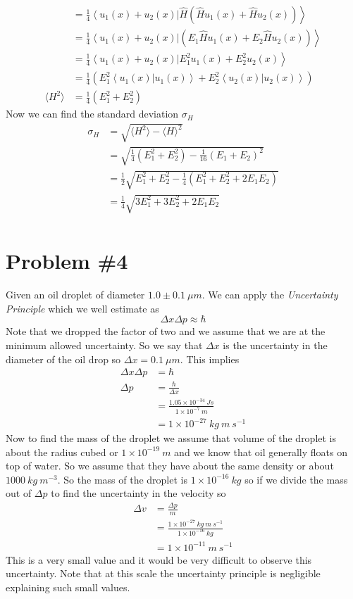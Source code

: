 \documentclass[11pt]{article}
\numberwithin{equation}{section}
\newcommand{\expt}[1]{\langle{#1}\rangle}
\newcommand{\norm}[2]{\left\langle{#1}\right|\left.{#2}\right\rangle}
\begin{document}
\begin{enumerate}[(a)]
\begin{align*}
&= \frac{1}{4}\norm{u_1(x)+u_2(x)}{\hat{H}\left(\hat{H}u_1(x)+\hat{H}u_2(x)\right)} \\
&= \frac{1}{4}\norm{u_1(x)+u_2(x)}{\left(E_1\hat{H}u_1(x)+E_2\hat{H}u_2(x)\right)} \\
&= \frac{1}{4}\norm{u_1(x)+u_2(x)}{E_1^2u_1(x)+E_2^2u_2(x)} \\
&= \frac{1}{4}\left(E_1^2\norm{u_1(x)}{u_1(x)}+E_2^2\norm{u_2(x)}{u_2(x)}\right) \\
\expt{H^2} &= \frac{1}{4}\left(E_1^2+E_2^2\right)
\end{align*}
Now we can find the standard deviation $\sigma_H$
\begin{align*}
\sigma_H &= \sqrt{\expt{H^2} - \expt{H}^2}\\
&= \sqrt{\frac{1}{4}\left(E_1^2+E_2^2\right) - \frac{1}{16}\left(E_1+E_2\right)^2}\\
&= \frac{1}{2}\sqrt{E_1^2+E_2^2 - \frac{1}{4}\left(E_1^2+E_2^2+2E_1E_2\right)}\\
&= \frac{1}{4}\sqrt{3E_1^2+3E_2^2 + 2E_1E_2}\\
\end{align*}
\end{enumerate}

\section{Problem \#4}
Given an oil droplet of diameter $1.0\pm0.1\ \mu m$. We can apply the \emph{Uncertainty Principle} which we well estimate as
$$\Delta x\Delta p\approx\hbar$$
Note that we dropped the factor of two and we assume that we are at the minimum allowed uncertainty. So we say that $\Delta x$ is the uncertainty in the diameter of the oil drop so $\Delta x=0.1\ \mu m$. This implies
\begin{align*}
\Delta x\Delta p &= \hbar\\
\Delta p &= \frac{\hbar}{\Delta x}\\
&= \frac{1.05\times10^{-34}\ Js}{1\times10^{-7}\ m}\\
&= 1\times10^{-27}\ kg\ m\ s^{-1}
\end{align*}
Now to find the mass of the droplet we assume that volume of the droplet is about the radius cubed or $1\times10^{-19}\ m$ and we know that oil generally floats on top of water. So we assume that they have about the same density or about $1000\ kg\ m^{-3}$. So the mass of the droplet is $1\times10^{-16}\ kg$ so if we divide the mass out of $\Delta p$ to find the uncertainty in the velocity so
\begin{align*}
\Delta v &= \frac{\Delta p}{m}\\
&= \frac{1\times10^{-27}\ kg\ m\ s^{-1}}{1\times10^{-16}\ kg}\\
&= 1\times10^{-11}\ m\ s^{-1}
\end{align*}
This is a very small value and it would be very difficult to observe this uncertainty. Note that at this scale the uncertainty principle is negligible explaining such small values.
\end{document}
